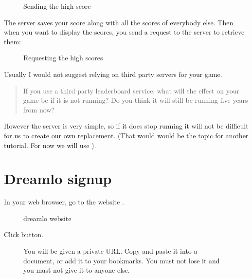 \documentclass[a4paper,12pt,english]{sphinxmanual}
\begin{document}
\begin{figure}[htbp]
\centering
\capstart

\noindent{}
\caption{Sending the high score}\label{\detokenize{tutorial:id7}}\end{figure}

\sphinxAtStartPar
The server saves your score along with all the scores of everybody else.
Then when you want to display the scores, you send a request to the
server to retrieve them:

\begin{figure}[htbp]
\centering
\capstart

\noindent{}
\caption{Requesting the high scores}\label{\detokenize{tutorial:id8}}\end{figure}

\sphinxAtStartPar
Usually I would not suggest relying on third party servers for your
game.
\begin{quote}

\sphinxAtStartPar
If you use a third party leaderboard service, what will the effect on
your game be if it is not running? Do you think it will still be
running five years from now?
\end{quote}

\sphinxAtStartPar
However the  server is very simple, so if it does stop running
it will not be difficult for us to create our own replacement. (That
would would be the topic for another tutorial. For now we will use
).


\section{Dreamlo sign\sphinxhyphen{}up}
\label{\detokenize{tutorial:dreamlo-sign-up}}
\sphinxAtStartPar
In your web browser, go to the website
.

\begin{figure}[htbp]
\centering
\capstart

\noindent{}
\caption{dreamlo website}\label{\detokenize{tutorial:id9}}\end{figure}

\sphinxAtStartPar
Click  button.

\begin{figure}[htbp]
\centering
\capstart

\noindent{}
\caption{You will be given a private URL. Copy and paste it into a document,
or add it to your bookmarks. You must not lose it and you must not
give it to anyone else.}\label{\detokenize{tutorial:id10}}\end{figure}
\end{document}
